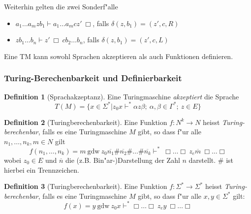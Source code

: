 \documentclass[german, 10pt, a4paper, twocolumn]{scrartcl}
\theoremstyle{definition}
\newtheorem*{definition}{Definition}
\theoremstyle{example}
\begin{document}
Weiterhin gelten die zwei Sonderf"alle
	\begin{itemize}
		\item $a_1 \ldots a_m z b_1 \vdash a_1 \ldots a_m c z'\ \Box$, falls $\delta(z,b_1)= (z',c,R)$
		\item $z b_1 \ldots b_n \vdash z'\ \Box \ c b_2 \ldots b_n$, falls $\delta(z,b_1)= (z',c,L)$
	\end{itemize}

Eine TM kann sowohl Sprachen akzeptieren als auch Funktionen definieren.

\subsubsection{Turing-Berechenbarkeit und Definierbarkeit}

\begin{definition}[Sprachakzeptanz]
	Eine Turingmaschine \textit{akzeptiert} die Sprache
	\begin{displaymath}
		T(M) = \{ x \in \Sigma^* | z_0 x \vdash^* \alpha z \beta;\ \alpha, \beta \in \Gamma^*;\ z \in E \}
	\end{displaymath}
\end{definition}

\begin{definition}[Turingberechenbarkeit]
	Eine Funktion $f: N^k \to N$ heisst \textit{Turing-berechenbar}, falls es eine Turingmaschine $M$ gibt, so dass f"ur alle $n_1,\ldots, n_k, m \in N$ gilt
\small
	\begin{displaymath}
		f(n_1,\ldots,n_k) = m \ \text{gdw} \ z_0 \overline{n_1} \# \overline{n_2} \# \ldots \# \overline{n_k} \vdash^* \ \Box  \ldots  \Box \ z_e \overline{m} \ \Box  \ldots  \Box
	\end{displaymath}
\normalsize
	wobei $z_0 \in E$ und $\overline{n}$ die (z.B. Bin"ar-)Darstellung der Zahl $n$ darstellt. $\#$ ist hierbei ein Trennzeichen.
\end{definition}

\begin{definition}[Turingberechenbarkeit]
	Eine Funktion $f: \Sigma^* \to \Sigma^*$ heisst \textit{Turing-berechenbar}, falls es eine Turingmaschine $M$ gibt, so dass f"ur alle $x,y \in \Sigma^*$ gilt:
	\begin{displaymath}
		f(x) = y \ \text{gdw} \ z_0 x \vdash^* \Box \ldots \Box \ z_e y \ \Box \ldots \Box
	\end{displaymath}
\end{definition}
\end{document}
